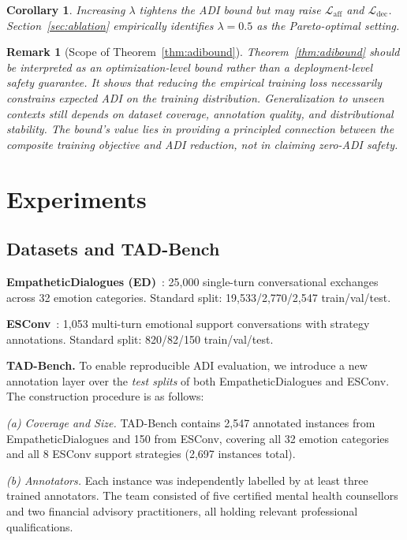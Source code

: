 \documentclass[lettersize,journal]{IEEEtran}
\newtheorem{corollary}{Corollary}
\newtheorem{remark}{Remark}
\begin{document}
\begin{corollary}
Increasing $\lambda$ tightens the ADI bound but may raise
$\mathcal{L}_\mathrm{aff}$ and $\mathcal{L}_\mathrm{dec}$.  Section~\ref{sec:ablation}
empirically identifies $\lambda{=}0.5$ as the Pareto-optimal setting.
\end{corollary}

\begin{remark}[Scope of Theorem~\ref{thm:adibound}]
Theorem~\ref{thm:adibound} should be interpreted as an
\emph{optimization-level bound} rather than a deployment-level safety
guarantee.  It shows that reducing the empirical training loss necessarily
constrains expected ADI on the training distribution.  Generalization to
unseen contexts still depends on dataset coverage, annotation quality, and
distributional stability.  The bound's value lies in providing a principled
connection between the composite training objective and ADI reduction,
not in claiming zero-ADI safety.
\end{remark}

\section{Experiments}
\label{sec:experiments}

\subsection{Datasets and TAD-Bench}

\textbf{EmpatheticDialogues (ED)}~\cite{rashkin2019empathetic}: 25,000
single-turn conversational exchanges across 32 emotion categories.
Standard split: 19,533/2,770/2,547 train/val/test.

\textbf{ESConv}~\cite{liu2021esc}: 1,053 multi-turn emotional support
conversations with strategy annotations.
Standard split: 820/82/150 train/val/test.

\textbf{TAD-Bench.}
To enable reproducible ADI evaluation, we introduce a new annotation layer
over the \emph{test splits} of both EmpatheticDialogues and ESConv.
The construction procedure is as follows:

\textit{(a) Coverage and Size.}
TAD-Bench contains 2,547 annotated instances from EmpatheticDialogues
and 150 from ESConv, covering all 32 emotion categories and all 8 ESConv
support strategies (2,697 instances total).

\textit{(b) Annotators.}
Each instance was independently labelled by at least three trained
annotators.  The team consisted of five certified mental health counsellors
and two financial advisory practitioners, all holding relevant professional
qualifications.
\end{document}
